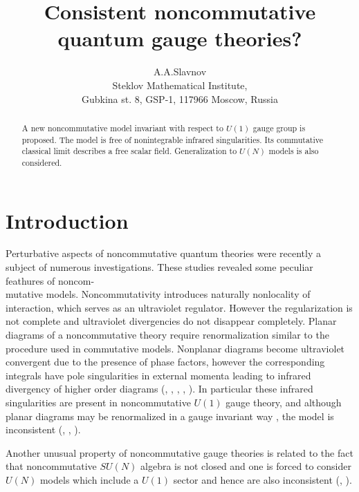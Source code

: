 \documentclass[a4paper,12pt]{article}
\begin{document}
\title{ Consistent noncommutative quantum gauge theories?}
\author{A.A.Slavnov \\ Steklov Mathematical
Institute, \\Gubkina st. 8, GSP-1, 117966 Moscow, Russia}  \maketitle

\begin{abstract}

A new noncommutative model invariant with respect to $U(1)$ gauge group
 is proposed. The model is free of nonintegrable infrared
 singularities. Its commutative classical limit describes a free
 scalar field. Generalization to $U(N)$ models is also
 considered.

\end{abstract}

\section{Introduction}

Perturbative aspects of noncommutative quantum theories were recently
 a subject of numerous investigations.
These studies revealed some peculiar feathures of noncom-\\mutative
models.  Noncommutativity introduces naturally nonlocality of interaction,
which serves as an ultraviolet regulator. However the regularization is
not complete and ultraviolet divergencies do not disappear completely.
Planar diagrams of a noncommutative theory require renormalization similar
to the procedure used in commutative models. Nonplanar diagrams become
ultraviolet convergent due to the presence of phase factors, however
the corresponding integrals have pole singularities in external
momenta leading to infrared divergency of higher order diagrams
(\cite{Fi}, \cite{KW}, \cite{MRS}, \cite{ABK}, \cite{GKW}).  In
particular these infrared singularities are present in noncommutative
$U(1)$ gauge theory, and although planar diagrams may be renormalized in a
gauge invariant way \cite{MS}, the model is inconsistent
(\cite{Ha}, \cite{MST}, \cite{ABKR}).

Another unusual property of noncommutative gauge theories is related to
the fact that noncommutative $SU(N)$ algebra is not closed and one is
forced to consider $U(N)$ models which include a $U(1)$ sector and
hence are also inconsistent (\cite{AA}, \cite{BS}).
\end{document}
